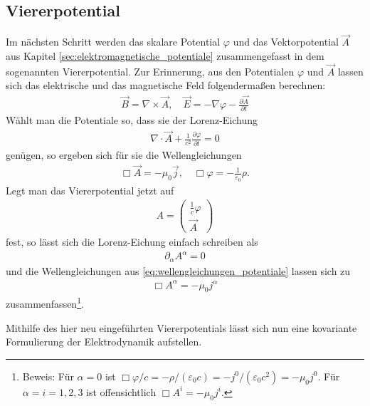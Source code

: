 \subsection{Viererpotential}

Im nächsten Schritt werden das skalare Potential $\varphi$ und das Vektorpotential $\vec A$ aus Kapitel \ref{sec:elektromagnetische_potentiale} zusammengefasst in dem sogenannten Viererpotential.
Zur Erinnerung, aus den Potentialen $\varphi$ und $\vec A$ lassen sich das elektrische und das magnetische Feld folgendermaßen berechnen:
\begin{align*}
    \vec B = \nabla\times \vec A, \quad \vec E=-\nabla\varphi-\frac{\partial\vec A}{\partial t}
\end{align*}
Wählt man die Potentiale so, dass sie der Lorenz-Eichung
\begin{align*}
    \nabla\cdot\vec A +\frac{1}{c^2}\frac{\partial\varphi}{\partial t}=0
\end{align*}
genügen, so ergeben sich für sie die Wellengleichungen
\begin{align}
    \label{eq:wellengleichungen_potentiale}
    \Box\vec A=-\mu_0\vec j, \quad \Box \varphi=-\frac{1}{\varepsilon_0}\rho.
\end{align}
Legt man das Viererpotential jetzt auf
\begin{align*}
    \boxed{A= \begin{pmatrix}
                      \frac{1}{c}\varphi \\
                      \vec A
                  \end{pmatrix}
    }
\end{align*}
fest, so lässt sich die Lorenz-Eichung einfach schreiben als
\begin{align}
    \label{eq:lorentz_eichung_kovariant}
    \boxed{\partial_\alpha A^\alpha=0}
\end{align}
und die Wellengleichungen aus \eqref{eq:wellengleichungen_potentiale} lassen sich zu
\begin{align}
    \label{eq:wellengleichungen_potential_kovariant}
    \boxed{\Box A^\alpha=-\mu_0 j^\alpha}
\end{align}
zusammenfassen\footnote{Beweis: Für $\alpha=0$ ist $\Box\varphi/c=-\rho/(\varepsilon_0c)=-j^0/(\varepsilon_0c^2)=-\mu_0j^0$. Für $\alpha=i=1,2,3$ ist offensichtlich $\Box A^i=-\mu_0 j^i$. }.

Mithilfe des hier neu eingeführten Viererpotentials lässt sich nun eine kovariante Formulierung der Elektrodynamik aufstellen.



